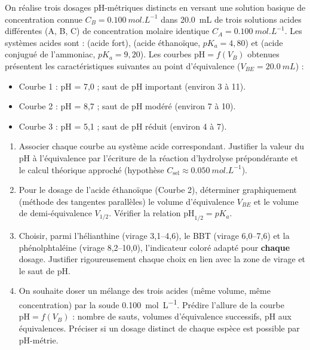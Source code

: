 \documentclass[11pt]{article}
\begin{document}
\begin{exercice}
On réalise trois dosages pH-métriques distincts en versant une solution basique de concentration connue $C_B = \SI{0,100}{mol.L^{-1}}$ dans \SI{20,0}{mL} de trois solutions acides différentes (A, B, C) de concentration molaire identique $C_A = \SI{0,100}{mol.L^{-1}}$.
Les systèmes acides sont :  (acide fort),  (acide éthanoïque, $pK_a = 4,80$) et  (acide conjugué de l'ammoniac, $pK_a = 9,20$).
Les courbes $\text{pH} = f(V_B)$ obtenues présentent les caractéristiques suivantes au point d'équivalence ($V_{BE} = \SI{20,0}{mL}$) :
\begin{itemize}
    \item Courbe 1 : pH = 7,0 ; saut de pH important (environ 3 à 11).
    \item Courbe 2 : pH = 8,7 ; saut de pH modéré (environ 7 à 10).
    \item Courbe 3 : pH = 5,1 ; saut de pH réduit (environ 4 à 7).
\end{itemize}
\begin{enumerate}
    \item Associer chaque courbe au système acide correspondant. Justifier la valeur du pH à l'équivalence par l'écriture de la réaction d'hydrolyse prépondérante et le calcul théorique approché (hypothèse $C_{\text{sel}} \approx \SI{0,050}{mol.L^{-1}}$).
    \item Pour le dosage de l'acide éthanoïque (Courbe 2), déterminer graphiquement (méthode des tangentes parallèles) le volume d'équivalence $V_{BE}$ et le volume de demi-équivalence $V_{1/2}$. Vérifier la relation $\text{pH}_{1/2} = pK_a$.
    \item Choisir, parmi l'hélianthine (virage 3,1--4,6), le BBT (virage 6,0--7,6) et la phénolphtaléine (virage 8,2--10,0), l'indicateur coloré adapté pour \textbf{chaque} dosage. Justifier rigoureusement chaque choix en lien avec la zone de virage et le saut de pH.
    \item On souhaite doser un mélange des trois acides (même volume, même concentration) par la soude \SI{0,100}{mol.L^{-1}}. Prédire l'allure de la courbe $\text{pH} = f(V_B)$ : nombre de sauts, volumes d'équivalence successifs, pH aux équivalences. Préciser si un dosage distinct de chaque espèce est possible par pH-métrie.
\end{enumerate}
\end{exercice}
\end{document}
